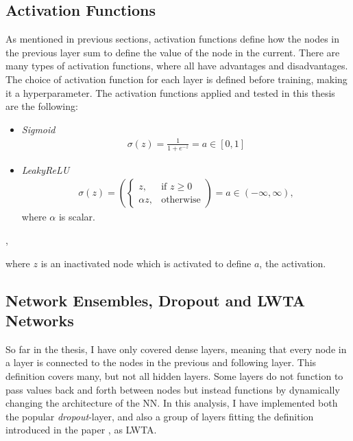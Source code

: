 \subsection{Activation Functions}\label{subsec:activation}
As mentioned in previous sections, activation functions define how the nodes in the previous layer 
sum to define the value of the node in the current. There are many types of activation functions, 
where all have advantages and disadvantages. The choice of activation function for each layer is defined
before training, making it a hyperparameter. The activation functions applied and tested in this thesis are the following:
\begin{center}
\begin{itemize}
    \item  \emph{Sigmoid}\\  
    \begin{align*}
         \sigma{(z)} = \frac{1}{1+e^{-z}} = a \in [0,1]
    \end{align*}
    \item \emph{LeakyReLU}
    \begin{align*}
        \sigma{(z)} = \left(
        \begin{cases}
            z,& \text{if } z\geq 0\\
            \alpha z,              & \text{otherwise}
        \end{cases}\right)
        = a \in (-\infty, \infty),
   \end{align*}
   where $\alpha$ is scalar.
\end{itemize},
\end{center}
where $z$ is an inactivated node which is activated to define $a$, the activation.

\subsection{Network Ensembles, Dropout and LWTA Networks}\label{subsec:LWTA}
So far in the thesis, I have only covered dense layers, meaning that every node in a layer 
is connected to the nodes in the previous and following layer. 
This definition covers many, but not all hidden layers. Some layers do not function to pass values back and forth between 
nodes but instead functions by dynamically changing the architecture of the \ac{NN}. In this analysis, 
I have implemented both the popular \emph{dropout}-layer, and also a group of layers fitting the definition 
introduced in the paper \cite{srivastava_compete_2013}, as \ac{LWTA}.
